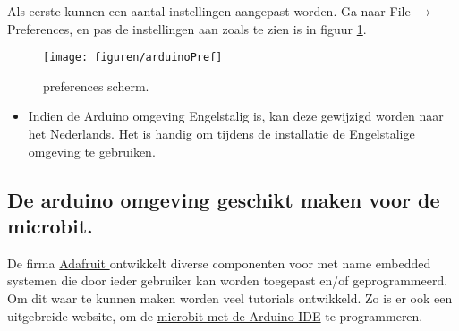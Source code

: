 Als eerste kunnen een aantal instellingen aangepast worden. Ga naar File $\rightarrow$ Preferences, en pas de instellingen aan zoals te zien is in figuur \ref{fig:arduinoPref}.
\begin{figure}[H]
	\captionsetup{justification=centering}
	\texttt{[image: figuren/arduinoPref]}
	\centering
	\caption{preferences scherm.}
	\label{fig:arduinoPref}
\end{figure}

\begin{itemize}
	\item Indien de Arduino omgeving Engelstalig is, kan deze gewijzigd worden naar het Nederlands. Het is handig om tijdens de installatie de Engelstalige omgeving te gebruiken.
\end{itemize}
\subsection{De arduino omgeving geschikt maken voor de microbit.}\label{sec:instArdOmg}

De firma \href{https://www.adafruit.com/about}{Adafruit } ontwikkelt diverse componenten voor met name embedded systemen
die door ieder gebruiker kan worden toegepast en/of geprogrammeerd. Om dit waar te kunnen maken worden veel tutorials ontwikkeld. Zo is er ook een uitgebreide website, om de \href{https://learn.adafruit.com/use-micro-bit-with-arduino}{microbit met de Arduino IDE} te programmeren.

